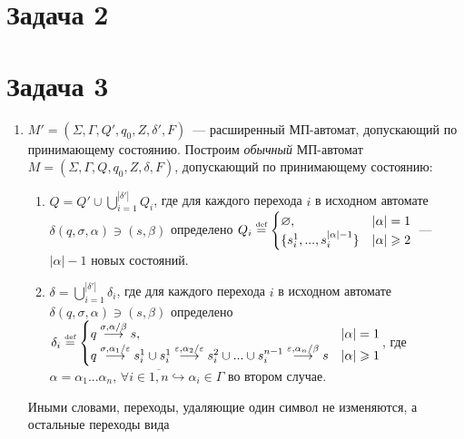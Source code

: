 \documentclass[a4paper]{article}
\def\eqdef{\overset{\mbox{\tiny def}}{=}}
\begin{document}
\section*{Задача 2}
\section*{Задача 3}
\begin{enumerate}
\item $M'=(\Sigma,\Gamma,Q',q_0,Z,\delta',F)$~--- расширенный МП-автомат, допускающий по принимающему состоянию. Построим {\em обычный} МП-автомат $M=(\Sigma,\Gamma,Q,q_0,Z,\delta,F)$, допускающий по принимающему состоянию:\begin{enumerate}
\item $Q=Q'\cup\bigcup\limits_{i=1}^{|\delta'|}Q_i$, где для каждого перехода $i$ в исходном автомате $\delta(q,\sigma,\alpha)\ni(s,\beta)$ определено\newline
$Q_i\eqdef\begin{cases}
\varnothing, & |\alpha|=1\\
\{s^1_i,...,s^{|\alpha|-1}_i\} & |\alpha|\geqslant 2
\end{cases}$~--- $|\alpha|-1$ новых состояний.
\item $\delta=\bigcup\limits_{i=1}^{|\delta'|}\delta_i$, где для каждого перехода $i$ в исходном автомате $\delta(q,\sigma,\alpha)\ni(s,\beta)$ определено\newline
$\delta_i\eqdef\begin{cases}
q\overset{\sigma,\alpha/\beta}{\longrightarrow} s, & |\alpha|=1\\
q\overset{\sigma,\alpha_1/\varepsilon}{\longrightarrow}s_i^1\cup s_i^1\overset{\varepsilon,\alpha_2/\varepsilon}{\longrightarrow}s_i^2\cup...\cup s_i^{n-1}\overset{\varepsilon,\alpha_n/\beta}{\longrightarrow}s & |\alpha|\geqslant 1
\end{cases}$, где $\alpha=\alpha_1...\alpha_n,\,\forall i\in\overline{1,n}\hookrightarrow \alpha_i\in \Gamma$ во втором случае.
\end{enumerate}
Иными словами, переходы, удаляющие один символ не изменяются, а остальные переходы вида
\begin{center}
\end{center}


\end{enumerate}
\end{document}
